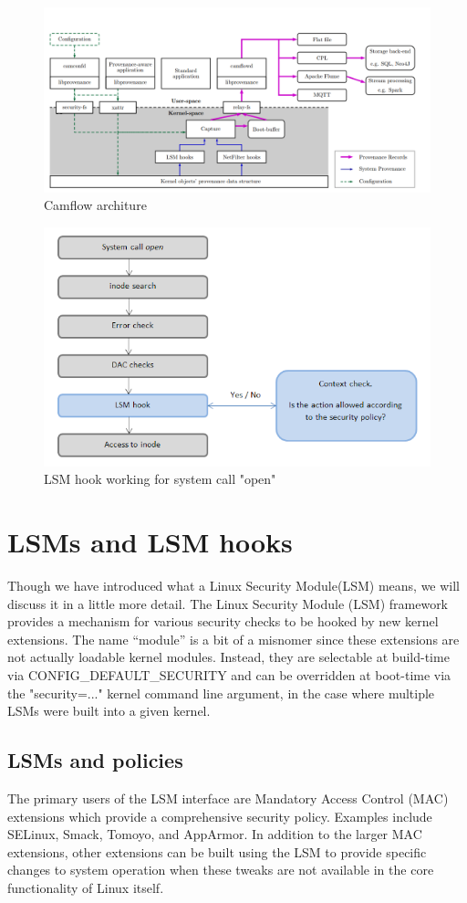\begin{figure}
	\centering
	\includegraphics[width=0.7\linewidth]{camflow}
	\caption[Architecture overview]{Camflow architure}
	\label{fig:camflow}
\end{figure}
\begin{figure}
	\centering
	\includegraphics[width=0.7\linewidth]{LSM-hook}
	\caption[LSM hook]{LSM hook working for system call "open"}
	\label{fig:lsm-hook}
\end{figure}


\label{Introduction}
\section{LSMs and LSM hooks}
Though we have introduced what a Linux Security Module(LSM) means, we will discuss it in a little more detail. The Linux Security Module (LSM) framework provides a mechanism for various security checks to be hooked by new kernel extensions. The name “module” is a bit of a misnomer since these extensions are not actually loadable kernel modules. Instead, they are selectable at build-time via CONFIG\_DEFAULT\_SECURITY and can be overridden at boot-time via the "security=..." kernel command line argument, in the case where multiple LSMs were built into a given kernel.
\subsection{LSMs and policies}
The primary users of the LSM interface are Mandatory Access Control (MAC) extensions which provide a comprehensive security policy. Examples include SELinux, Smack, Tomoyo, and AppArmor. In addition to the larger MAC extensions, other extensions can be built using the LSM to provide specific changes to system operation when these tweaks are not available in the core functionality of Linux itself.
